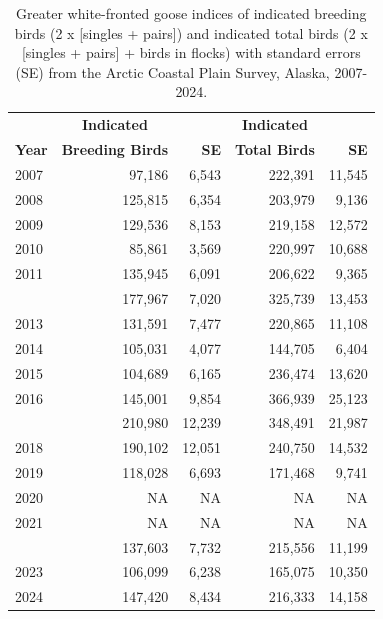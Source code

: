 \documentclass[
]{article}
\begin{document}
\begingroup\fontsize{10}{12}\selectfont

\begin{longtable}[t]{lrrrr}

\caption{\label{tbl-GWFG}Greater white-fronted goose indices of
indicated breeding birds (2 x {[}singles + pairs{]}) and indicated total
birds (2 x {[}singles + pairs{]} + birds in flocks) with standard errors
(SE) from the Arctic Coastal Plain Survey, Alaska, 2007-2024.}

\tabularnewline

\\
\toprule
\multicolumn{1}{c}{\textbf{ }} & \multicolumn{1}{c}{\textbf{Indicated}} & \multicolumn{1}{c}{\textbf{ }} & \multicolumn{1}{c}{\textbf{Indicated}} & \multicolumn{1}{c}{\textbf{ }} \\
\cmidrule(l{3pt}r{3pt}){2-2} \cmidrule(l{3pt}r{3pt}){4-4}
\textbf{Year} & \textbf{Breeding Birds} & \textbf{SE} & \textbf{Total Birds} & \textbf{SE}\\
\midrule
2007 & 97,186 & 6,543 & 222,391 & 11,545\\
2008 & 125,815 & 6,354 & 203,979 & 9,136\\
2009 & 129,536 & 8,153 & 219,158 & 12,572\\
2010 & 85,861 & 3,569 & 220,997 & 10,688\\
2011 & 135,945 & 6,091 & 206,622 & 9,365\\
\addlinespace
2012 & 177,967 & 7,020 & 325,739 & 13,453\\
2013 & 131,591 & 7,477 & 220,865 & 11,108\\
2014 & 105,031 & 4,077 & 144,705 & 6,404\\
2015 & 104,689 & 6,165 & 236,474 & 13,620\\
2016 & 145,001 & 9,854 & 366,939 & 25,123\\
\addlinespace
2017 & 210,980 & 12,239 & 348,491 & 21,987\\
2018 & 190,102 & 12,051 & 240,750 & 14,532\\
2019 & 118,028 & 6,693 & 171,468 & 9,741\\
2020 & NA & NA & NA & NA\\
2021 & NA & NA & NA & NA\\
\addlinespace
2022 & 137,603 & 7,732 & 215,556 & 11,199\\
2023 & 106,099 & 6,238 & 165,075 & 10,350\\
2024 & 147,420 & 8,434 & 216,333 & 14,158\\
\bottomrule

\end{longtable}
\end{document}
